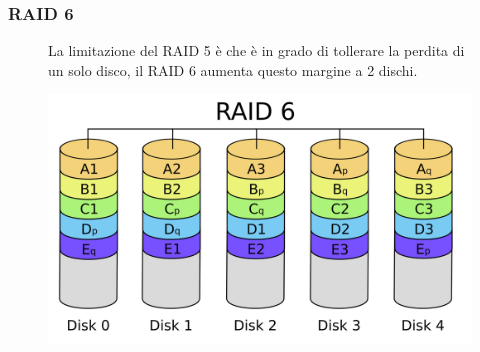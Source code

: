 \subsubsection*{RAID 6}
\begin{figure}[H]
    \centering
    \begin{minipage}{0.65\textwidth}
        La limitazione del RAID 5 è che è in grado di tollerare la perdita di un solo disco, il RAID 6 aumenta questo margine a 2 dischi.
    \end{minipage}
    \hfill
    \begin{minipage}{0.3\textwidth}
        \centering
        \includegraphics[width=1\linewidth]{assets/RAID_6.png}
    \end{minipage}
\end{figure}
